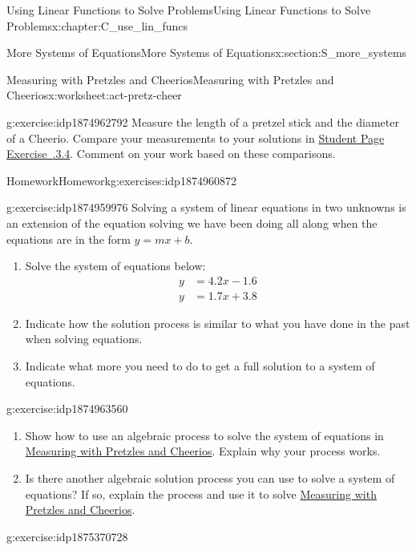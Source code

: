 \documentclass[oneside,10pt,]{book}
\newcommand{\xreffont}{\relax}
\numberwithin{equation}{chapter}
\newcommand{\amp}{&}
\begin{document}
\begin{chapterptx}{Using Linear Functions to Solve Problems}{}{Using Linear Functions to Solve Problems}{}{}{x:chapter:C_use_lin_funcs}
\begin{sectionptx}{More Systems of Equations}{}{More Systems of Equations}{}{}{x:section:S_more_systems}
\begin{worksheet-subsection}{Measuring with Pretzles and Cheerios}{}{Measuring with Pretzles and Cheerios}{}{}{x:worksheet:act-pretz-cheer}
\begin{divisionexercise}{6}{}{}{g:exercise:idp1874962792}
Measure the length of a pretzel stick and the diameter of a Cheerio. Compare your measurements to your solutions in \hyperlink{x:exercise:exer-pretz-intersect}{Student Page Exercise~{\xreffont 3.6.3.4}}. Comment on your work based on these comparisons.%
\end{divisionexercise}%
\end{worksheet-subsection}
\restoregeometry
%
%
\typeout{************************************************}
\typeout{************************************************}
%
\begin{exercises-subsection}{Homework}{}{Homework}{}{}{g:exercises:idp1874960872}
\begin{divisionexercise}{1}{}{}{g:exercise:idp1874959976}%
Solving a system of linear equations in two unknowns is an extension of the equation solving we have been doing all along when the equations are in the form \(y = mx + b\).%
\begin{enumerate}[font=\bfseries,label=(\alph*),ref=\alph*]
\item{}Solve the system of equations below:%
\begin{align*}
y \amp = 4.2x - 1.6\\
y \amp = 1.7x + 3.8
\end{align*}
%
\item{}Indicate how the solution process is similar to what you have done in the past when solving equations.%
\item{}Indicate what more you need to do to get a full solution to a system of equations.%
\end{enumerate}
\end{divisionexercise}%
\begin{divisionexercise}{2}{}{}{g:exercise:idp1874963560}%
\begin{enumerate}[font=\bfseries,label=(\alph*),ref=\alph*]
\item{}Show how to use an algebraic process to solve the system of equations in \hyperref[x:worksheet:act-pretz-cheer]{Measuring with Pretzles and Cheerios}. Explain why your process works.%
\item{}Is there another algebraic solution process you can use to solve a system of equations? If so, explain the process and use it to solve \hyperref[x:worksheet:act-pretz-cheer]{Measuring with Pretzles and Cheerios}.%
\end{enumerate}
\end{divisionexercise}%
\begin{divisionexercise}{3}{}{}{g:exercise:idp1875370728}%

\end{divisionexercise}
\end{exercises-subsection}
\end{sectionptx}
\end{chapterptx}
\end{document}
